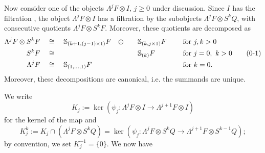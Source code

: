 \documentclass[11pt]{article}
\theoremstyle{plain}
\theoremstyle{nonumberplain}
\theoremstyle{plain}
\numberwithin{equation}{section}
\renewcommand{\theequation}{\thesection-\arabic{equation}}
\theoremstyle{nonumberplain}
\newcommand\bS{{\mathbb S}}
\newcommand\1{{\bf 1}}
\newcommand\numberthis{\addtocounter{equation}{1}\tag{\theequation}}
\begin{document}
Now consider one of the objects $\Lambda^j F\otimes I$, $j\ge 0$ under discussion. Since $I$ has the filtration , %
 the object $\Lambda^j F\otimes I$ has a filtration by the subobjects $\Lambda^{j} F\otimes S^{k}Q$, with consecutive quotients $\Lambda^j F\otimes S^k F$. Moreover, these quotients are decomposed as %
\begin{alignat*}{3}
  \Lambda^j F\otimes S^k F&\quad\cong\quad \bS_{(k+1, (j-1)\times 1)}F \quad \oplus\quad &&\bS_{(k, j\times 1)}F&&\quad \text{ for }j,k>0\\
  S^k F &\quad\cong\quad &&\bS_{(k)}F &&\quad \text{ for }j=0,\ k>0\numberthis\label{eq:decs}\\
  \Lambda^j F &\quad\cong\quad \bS_{(1,\ldots, 1)}F&& &&\quad \text{ for }k=0.
\end{alignat*}
Moreover, these decompositions are canonical, i.e. the summands are unique. 

We write
\begin{equation}\label{eq:kj}
  K_j:=\ker\left(\psi_j:\Lambda^j F\otimes I \to \Lambda^{j+1} F\otimes I\right)
\end{equation}
for the kernel of the map  and
\begin{equation*}
  K_j^k:= K_j\cap \left(\Lambda^j F\otimes S^kQ\right) = \ker\left(\psi_j:\Lambda^j F\otimes S^kQ \to \Lambda^{j+1} F\otimes S^{k-1}Q\right);
\end{equation*}
by convention, we set $K_j^{-1}=\{0\}$. We now have
\end{document}
